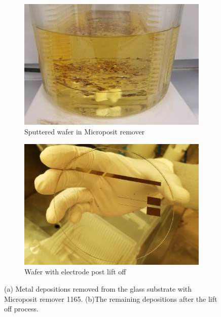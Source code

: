 \begin{figure}[h]
    \centering
    \begin{subfigure}[b]{0.45\textwidth}
        \includegraphics[width=\textwidth]{images/lift_off.jpg}
        \caption{Sputtered wafer in Microposit remover}
        \label{fig:lift_solution}
    \end{subfigure}
    \hfill
    \begin{subfigure}[b]{0.45\textwidth}
        \centering
        \includegraphics[width=\textwidth]{images/electrodes.jpg}
        \caption{Wafer with electrode post lift off}
        \label{fig:electrode_methods}
    \end{subfigure} 
    \caption[Lift off]{(a) Metal depositions removed from the glass substrate with Microposit remover 1165. (b)The remaining depositions after the lift off process.}
    \label{fig:electrode_methods}
\end{figure}

